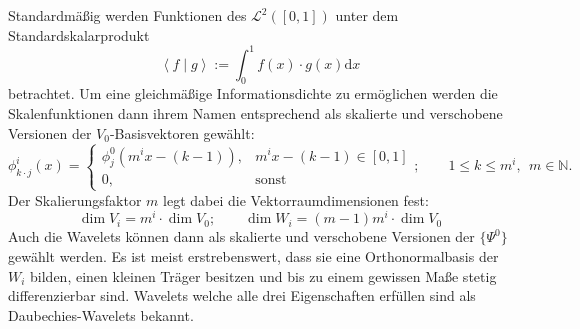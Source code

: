 Standardmäßig werden Funktionen des $\mathcal{L}^2([0,1])$ unter dem Standardskalarprodukt\begin{equation*}
\left\langle f\mid g\right\rangle :=\int_{0}^{1}f(x)\cdot g(x)\mathrm{d}x
\end{equation*}betrachtet. Um eine gleichmäßige Informationsdichte zu ermöglichen werden die Skalenfunktionen dann ihrem Namen entsprechend als skalierte und verschobene Versionen der $V_0$-Basisvektoren gewählt:\begin{equation*}
\phi^i_{k\cdot j}(x)=\begin{cases}
\phi^0_j(m^i x-(k-1)),&m^i x-(k-1)\in[0,1]\\
0, &\mathrm{sonst}
\end{cases};\qquad 1\leq k\leq m^i, \ \ m\in \mathbb{N}.
\end{equation*}Der Skalierungsfaktor $m$ legt dabei die Vektorraumdimensionen fest:\begin{equation*}
\dim V_i=m^i\cdot \dim V_0;\qquad\dim W_i=(m-1)m^i\cdot \dim V_0
\end{equation*}Auch die Wavelets können dann als skalierte und verschobene Versionen der $\{\Psi^0\}$ gewählt werden. Es ist meist erstrebenswert, dass sie eine Orthonormalbasis der $W_i$ bilden, einen kleinen Träger besitzen und bis zu einem gewissen Maße stetig differenzierbar sind. Wavelets welche alle drei Eigenschaften erfüllen sind als Daubechies-Wavelets bekannt.

